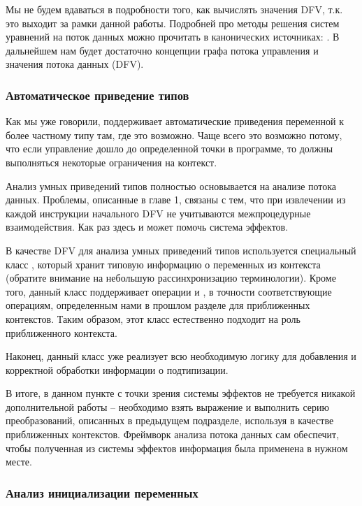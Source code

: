Мы не будем вдаваться в подробности того, как вычислять значения DFV, т.к. это выходит за рамки данной работы. Подробней про методы решения систем уравнений на поток данных можно прочитать в канонических источниках: \cite{dragon-book, muchnick}. В дальнейшем нам будет достаточно концепции графа потока управления и значения потока данных (DFV).

\subsubsection{Автоматическое приведение типов}

\label{section-upgrading-smartcasts}

Как мы уже говорили,  поддерживает автоматические приведения переменной к более частному типу там, где это возможно. Чаще всего это возможно потому, что если управление дошло до определенной точки в программе, то должны выполняться некоторые ограничения на контекст.

Анализ умных приведений типов полностью основывается на анализе потока данных. Проблемы, описанные в главе 1, связаны с тем, что при извлечении из каждой инструкции начального DFV не учитываются межпроцедурные взаимодействия. Как раз здесь и может помочь система эффектов.

В качестве DFV для анализа умных приведений типов используется специальный класс , который хранит типовую информацию о переменных из контекста (обратите внимание на небольшую рассинхронизацию терминологии). Кроме того, данный класс поддерживает операции  и , в точности соответствующие операциям, определенным нами в прошлом разделе для приближенных контекстов. Таким образом, этот класс естественно подходит на роль приближенного контекста.

Наконец, данный класс уже реализует всю необходимую логику для добавления и корректной обработки информации о подтипизации. 

В итоге, в данном пункте с точки зрения системы эффектов не требуется никакой дополнительной работы -- необходимо взять выражение и выполнить серию преобразований, описанных в предыдущем подразделе, используя  в качестве приближенных контекстов. Фреймворк анализа потока данных сам обеспечит, чтобы полученная из системы эффектов информация была применена в нужном месте.


\subsubsection{Анализ инициализации переменных}

